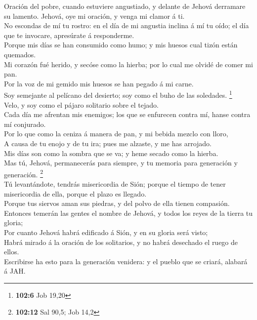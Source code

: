  Oración del pobre, cuando estuviere angustiado, y delante
de Jehová derramare su lamento. Jehová, oye mi oración, y venga mi
clamor á ti.\\
 No escondas de mí tu rostro: en el día de mi angustia
inclina á mí tu oído; el día que te invocare, apresúrate á
responderme.\\
 Porque mis días se han consumido como humo; y mis huesos
cual tizón están quemados.\\
 Mi corazón fué herido, y secóse como la hierba; por lo cual
me olvidé de comer mi pan.\\
 Por la voz de mi gemido mis huesos se han pegado á mi
carne.\\
 Soy semejante al pelícano del desierto; soy como el buho de
las soledades. \footnote{\textbf{102:6} Job 19,20}\\
 Velo, y soy como el pájaro solitario sobre el tejado.\\
 Cada día me afrentan mis enemigos; los que se enfurecen
contra mí, hanse contra mí conjurado.\\
 Por lo que como la ceniza á manera de pan, y mi bebida
mezclo con lloro,\\
 A causa de tu enojo y de tu ira; pues me alzaste, y me has
arrojado.\\
 Mis días son como la sombra que se va; y heme secado como
la hierba.\\
 Mas tú, Jehová, permanecerás para siempre, y tu memoria
para generación y generación. \footnote{\textbf{102:12} Sal 90,5; Job
  14,2}\\
 Tú levantándote, tendrás misericordia de Sión; porque el
tiempo de tener misericordia de ella, porque el plazo es llegado.\\
 Porque tus siervos aman sus piedras, y del polvo de ella
tienen compasión.\\
 Entonces temerán las gentes el nombre de Jehová, y todos
los reyes de la tierra tu gloria;\\
 Por cuanto Jehová habrá edificado á Sión, y en su gloria
será visto;\\
 Habrá mirado á la oración de los solitarios, y no habrá
desechado el ruego de ellos.\\
 Escribirse ha esto para la generación venidera: y el
pueblo que se criará, alabará á JAH.\\
